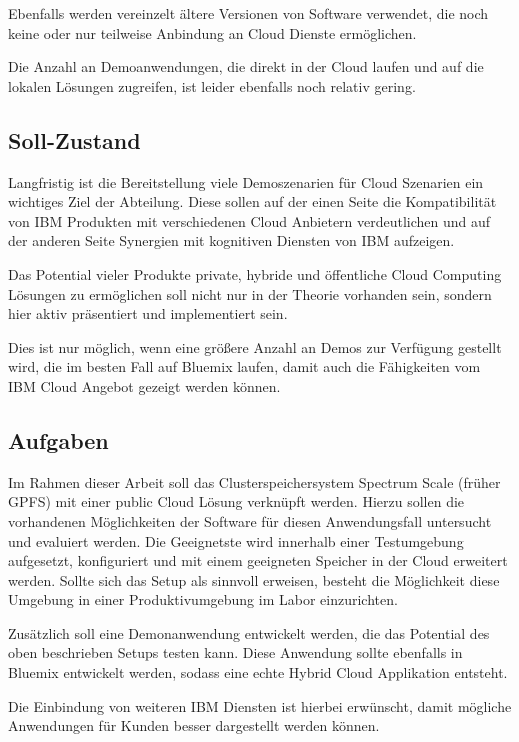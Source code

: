 Ebenfalls werden vereinzelt ältere Versionen von Software verwendet, die noch keine oder nur teilweise Anbindung an Cloud Dienste ermöglichen. 

Die Anzahl an Demoanwendungen, die direkt in der Cloud laufen und auf die lokalen Lösungen zugreifen, ist leider ebenfalls noch relativ gering. 

\subsection{Soll-Zustand}

Langfristig ist die Bereitstellung viele Demoszenarien für Cloud Szenarien ein wichtiges Ziel der Abteilung. Diese sollen auf der einen Seite die Kompatibilität von IBM Produkten mit verschiedenen Cloud Anbietern verdeutlichen und auf der anderen Seite Synergien mit kognitiven Diensten von IBM aufzeigen.

Das Potential vieler Produkte private, hybride und öffentliche Cloud Computing Lösungen zu ermöglichen soll nicht nur in der Theorie vorhanden sein, sondern hier aktiv präsentiert und implementiert sein.

Dies ist nur möglich, wenn eine größere Anzahl an Demos zur Verfügung gestellt wird, die im besten Fall auf \gls{Bluemix} laufen, damit auch die Fähigkeiten vom IBM Cloud Angebot gezeigt werden können. 

\subsection{Aufgaben}

Im Rahmen dieser Arbeit soll das Clusterspeichersystem Spectrum Scale (früher GPFS) mit einer public Cloud Lösung verknüpft werden. Hierzu sollen die vorhandenen Möglichkeiten der Software für diesen Anwendungsfall untersucht und evaluiert werden.
Die Geeignetste wird innerhalb einer Testumgebung aufgesetzt, konfiguriert und mit einem geeigneten Speicher in der Cloud erweitert werden. 
Sollte sich das Setup als sinnvoll erweisen, besteht die Möglichkeit diese Umgebung in einer Produktivumgebung im Labor einzurichten.

Zusätzlich soll eine Demonanwendung entwickelt werden, die das Potential des oben beschrieben Setups testen kann. Diese Anwendung sollte ebenfalls in \gls{Bluemix} entwickelt werden, sodass eine echte Hybrid Cloud Applikation entsteht. 


Die Einbindung von weiteren IBM Diensten ist hierbei erwünscht, damit mögliche Anwendungen für Kunden besser dargestellt werden können.

